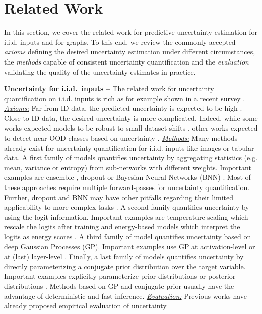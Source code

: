\section{Related Work} \label{sec:related_work}

In this section, we cover the related work for predictive uncertainty estimation for i.i.d. inputs and for graphs. To this end, we review the commonly accepted \emph{axioms} defining the desired uncertainty estimation under different circumstances, the \emph{methods} capable of consistent uncertainty quantification and the \emph{evaluation} validating the quality of the uncertainty estimates in practice.

\textbf{Uncertainty for i.i.d.\ inputs --} The related work for uncertainty quantification on i.i.d. inputs is rich as for example shown in a recent survey \citep{Abdar2020}. \emph{\underline{Axioms:}} Far from ID data, the predicted uncertainty is expected to be high \citep{provable-uncertainty, NatPN2021, bayesian-a-bit, sufficient-conditions-no-adversarial}. Close to ID data, the desired uncertainty is more complicated. Indeed, while some works expected models to be robust to small dataset shifts \citep{Ovadia2019, confidence-calibrated-adversarial}, other works expected to detect near OOD classes based on uncertainty \citep{contrastive-ood, robustness-uncertainty-dirichlet, attack-detection}. \emph{\underline{Methods:}} Many methods already exist for uncertainty quantification for i.i.d. inputs like images or tabular data. A first family of models quantifies uncertainty by aggregating statistics (e.g. mean, variance or entropy) from sub-networks with different weights. Important examples are ensemble \citep{Lakshminarayanan2017, batch-ensembles, hyper-ensembles, mimo-independent-subnetworks}, dropout \citep{Srivastava2014} or Bayesian Neural Networks (BNN) \citep{blundell2015, Depeweg2018, simple-baseline-uncertainty, liberty-depth-bnn, rank-1-bnn}. Most of these approaches require multiple forward-passes for uncertainty quantification. Further, dropout and BNN may have other pitfalls regarding their limited applicability to more complex tasks \citep{Osband2016, Hron2018, Graves2011, Foong2019}. A second family quantifies uncertainty by using the logit information. Important examples are temperature scaling which rescale the logits after training \citep{Guo2017, Liang2017} and energy-based models which interpret the logits as energy scores \citep{Liu2020a, Grathwohl2019}. A third family of model quantifies uncertainty based on deep Gaussian Processes (GP). Important examples use GP at activation-level \cite{gp-uncertainty-activation} or at (last) layer-level \citep{uncertainty-distance-awareness, bayesian-a-bit, duq, Bilovs2019}. Finally, a last family of models quantifies uncertainty by directly parameterizing a conjugate prior distribution over the target variable. Important examples explicitly parameterize prior distributions \citep{sensoy2018, Malinin2019a, Malinin2018, Malinin2019b, evidential-regression} or posterior distributions \citep{charpentier2020, NatPN2021}. Methods based on GP and conjugate prior usually have the advantage of deterministic and fast inference. \emph{\underline{Evaluation:}} Previous works have already proposed empirical evaluation of uncertainty 